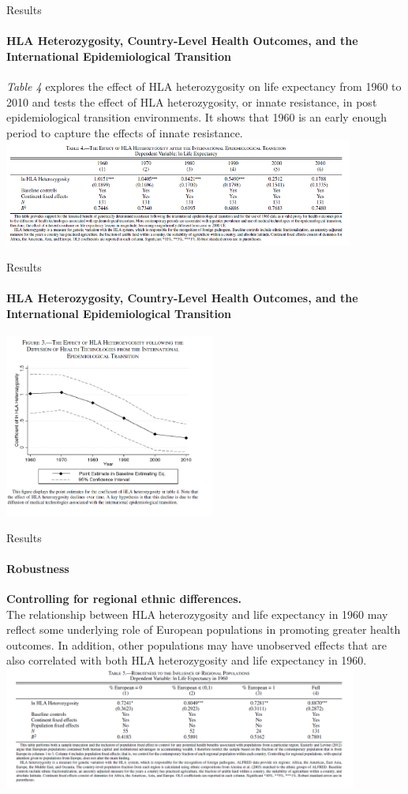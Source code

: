 \documentclass[pdftex,12pt,xcolor=pdftex,table]{beamer}
\theoremstyle{definition}
\theoremstyle{remark}
\numberwithin{equation}{section}
\numberwithin{figure}{section}
\begin{document}
\begin{frame}{Results}
\framesubtitle{HLA Heterozygosity, Country-Level Health Outcomes, and the International Epidemiological Transition}
\justifying
\textit{Table 4} explores the effect of HLA heterozygosity on life expectancy from 1960 to 2010 and tests the effect of HLA heterozygosity, or innate resistance, in post epidemiological transition environments. It shows that 1960 is an early enough period to capture the effects of innate resistance.\\
\includegraphics[height=3.5cm]{Table_4.PNG}
\end{frame}


\begin{frame}{Results}
\framesubtitle{HLA Heterozygosity, Country-Level Health Outcomes, and the International Epidemiological Transition}
\includegraphics[height=6cm]{Figure_3.PNG}
\end{frame}


\begin{frame}{Results}
\framesubtitle{Robustness}
\justifying
\textbf{Controlling for regional ethnic differences.}\\
The relationship between HLA heterozygosity and life expectancy in 1960 may reflect some underlying role of European populations in promoting greater health outcomes. In addition, other populations may have unobserved effects that are also correlated with both HLA heterozygosity and life expectancy in 1960.\\ 
\includegraphics[height=4cm]{Table_5.PNG}
\end{frame}
\end{document}
